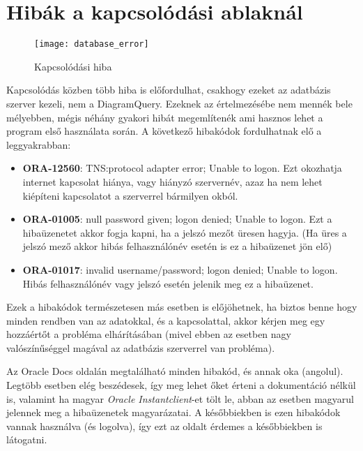 \section{Hibák a kapcsolódási ablaknál}

\begin{figure}[ht]
  \begin{center}
  \texttt{[image: database\_error]}
  \end{center}
 \caption{Kapcsolódási hiba}
\end{figure}

Kapcsolódás közben több hiba is előfordulhat, csakhogy ezeket az adatbázis szerver kezeli, nem a DiagramQuery.
Ezeknek az értelmezésébe nem mennék bele mélyebben, mégis néhány gyakori hibát megemlítenék ami hasznos lehet
a program első használata során. A következő hibakódok fordulhatnak elő a leggyakrabban:
\begin{itemize}
  \item \textbf{ORA-12560}: TNS:protocol adapter error; Unable to logon. Ezt okozhatja internet kapcsolat hiánya,
  vagy hiányzó szervernév, azaz ha nem lehet kiépíteni kapcsolatot a szerverrel bármilyen okból.
  \item \textbf{ORA-01005}: null password given; logon denied; Unable to logon. Ezt a hibaüzenetet akkor fogja kapni,
  ha a jelszó mezőt üresen hagyja. (Ha üres a jelszó mező akkor hibás felhasználónév esetén is ez a hibaüzenet jön elő)
  \item \textbf{ORA-01017}: invalid username/password; logon denied; Unable to logon. Hibás felhasználónév vagy jelszó 
  esetén jelenik meg ez a hibaüzenet.
\end{itemize}

Ezek a hibakódok természetesen más esetben is előjöhetnek, ha biztos benne hogy minden rendben van az adatokkal, és a
kapcsolattal, akkor kérjen meg egy hozzáértőt a probléma elhárításában (mivel ebben az esetben nagy valószínűséggel
magával az adatbázis szerverrel van probléma).

Az Oracle Docs\cite{oracledocs} oldalán megtalálható minden hibakód, és annak oka (angolul).
Legtöbb esetben elég beszédesek, így meg lehet őket érteni a dokumentáció nélkül is, valamint ha magyar
\textit{Oracle Instantclient}-et tölt le, abban az esetben magyarul jelennek meg a hibaüzenetek magyarázatai.
A későbbiekben is ezen hibakódok vannak használva (és logolva), így ezt az oldalt érdemes a későbbiekben is látogatni.

